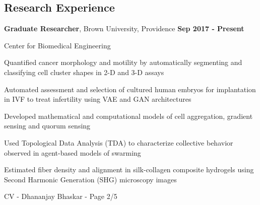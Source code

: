\documentclass[margin,line]{res}
\newenvironment{list1}{
  \begin{list}{\ding{113}}{
      \setlength{\itemsep}{0in}
      \setlength{\parsep}{0in} \setlength{\parskip}{0in}
      \setlength{\topsep}{0in} \setlength{\partopsep}{0in}
      \setlength{\leftmargin}{0.17in}}}{\end{list}}
\newenvironment{list3}{
  \begin{list}{\textopenbullet}{
      \setlength{\itemsep}{0in}
      \setlength{\parsep}{0in} \setlength{\parskip}{0in}
      \setlength{\topsep}{0in} \setlength{\partopsep}{0in}
      \setlength{\leftmargin}{0.1in}}}{\end{list}}
\begin{document}
\begin{resume}
\vspace*{.3cm}

\section{\sc Research Experience}

{\bf Graduate Researcher}, Brown University, Providence \hfill {\bf Sep 2017 - Present}\\
\vspace*{-.2cm}
\begin{list1}
\item[] Center for Biomedical Engineering
\vspace*{.2cm}
\begin{list3}
\setlength\itemsep{0.5em}
\item Quantified cancer morphology and motility by automatically segmenting and classifying cell cluster shapes in 2-D and 3-D assays
\item Automated assessment and selection of cultured human embryos for implantation in IVF to treat infertility using VAE and GAN architectures
\item Developed mathematical and computational models of cell aggregation, gradient sensing and quorum sensing
\item Used Topological Data Analysis (TDA) to characterize collective behavior observed in agent-based models of swarming
\item Estimated fiber density and alignment in silk-collagen composite hydrogels using Second Harmonic Generation (SHG) microscopy images
\end{list3}
\end{list1}

\newpage
\begin{flushright}
CV - Dhananjay Bhaskar - Page 2/5
\end{flushright}
\vspace*{.2cm}


\end{resume}
\end{document}

